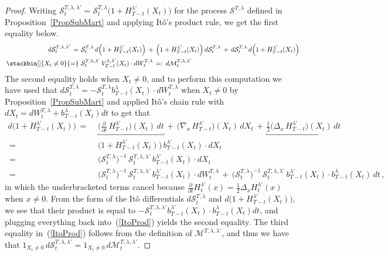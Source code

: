\documentclass[10pt]{article}
\numberwithin{equation}{section}
\theoremstyle{definition}
\begin{document}
\begin{proof}
   Writing $\mathcal{S}_{t}^{T,\lambda,\lambda'}=\mathcal{S}_{t}^{T,\lambda}\big(1+H_{T-t}^{\lambda'}(X_t)\big)$ for the process $\mathcal{S}^{T,\lambda}$ defined  in Proposition~\ref{PropSubMart}  and applying It\^o's product rule, we get the first equality below.
\begin{align} \label{ItoProd}
d\mathcal{S}_{t}^{T, \lambda ,\lambda'}\,=\,&\, \mathcal{S}_{t}^{T,\lambda}\, d\Big(1+H_{T-t}^{\lambda'}(X_t)\Big)\,+\,\Big(1+H_{T-t}^{\lambda'}(X_t)\Big)\,d\mathcal{S}_{t}^{T,\lambda}\,+\,d\mathcal{S}_{t}^{T,\lambda}\, d\Big(1+H_{T-t}^{\lambda'}(X_t)\Big) \nonumber  \\
 \,\stackbin[ ]{X_t\neq 0}{=}\,&\,\mathcal{S}_{t }^{T, \lambda,\lambda'}\,V_{T-t}^{\lambda,\lambda'}(X_t)\cdot dW_{t}^{T,\lambda}  \,=: \, d\mathcal{M}_{t}^{T, \lambda  ,\lambda'}  
\end{align}
The second equality holds when $X_t\neq 0$, and to perform this computation we have used that $d\mathcal{S}_{t}^{T,\lambda} =- \mathcal{S}_{t}^{T,\lambda}  b_{T-t}^{\lambda}( X_t)   \cdot dW_{t}^{T,\lambda}$ when $X_t\neq 0$ by Proposition~\ref{PropSubMart} and  applied It\^o's chain rule with $dX_t=dW_{t}^{T,\lambda}+b_{T-t}^{\lambda}(X_t)dt$ to get that
\begin{align*}
d\Big( 1+H_{T-t}^{\lambda'}(X_t)\Big)  
\,=\,&\,\underbracket{\Big( \frac{ \partial }{\partial t }\, H_{T-t}^{\lambda'} \Big)(X_t)\,dt} 
\,+\,\big(\nabla_x\, H_{T-t}^{\lambda'}\big)(X_t)\, dX_t\,+\,\underbracket{\frac{1}{2}\big(\Delta_x\, H_{T-t}^{\lambda'}\big)(X_t)\, dt} \\
\,=\,&\,\Big(1+H_{T-t}^{\lambda'}(X_t)\Big)\, b_{T-t}^{\lambda'}(X_t) \cdot  dX_{t} \\
\,=\,&\,\big(\mathcal{S}_{t}^{T,\lambda} \big)^{-1}\,\mathcal{S}_{t}^{T,\lambda,\lambda'}\, b_{T-t}^{\lambda'}(X_t) \cdot  dX_{t}
\\
\,=\,&\,\big(\mathcal{S}_{t}^{T,\lambda} \big)^{-1}\,\mathcal{S}_{t}^{T,\lambda,\lambda'}\, b_{T-t}^{\lambda'}(X_t) \cdot  dW_{t}^{T,\lambda}\,+\,\big(\mathcal{S}_{t}^{T,\lambda} \big)^{-1}\,\mathcal{S}_{t}^{T,\lambda,\lambda'}\, b_{T-t}^{\lambda'}(X_t) \cdot b_{T-t}^{\lambda}(X_t)\,dt\,,
\end{align*}
in which the underbracketed terms cancel  because $\frac{ \partial }{\partial t } H_{t}^{\lambda'}(x)= \frac{1}{2}\Delta_x H_{t}^{\lambda'}(x)$ when $x\neq 0$. From the form of the It\^o differentials  $d\mathcal{S}_{t}^{T,\lambda} $ and $ d\big(1+H_{T-t}^{\lambda'}(X_t)\big)$, we see that their product is equal to $-\mathcal{S}_{t}^{T,\lambda,\lambda'} b_{T-t}^{\lambda'}(X_t) \cdot b_{T-t}^{\lambda}(X_t)dt $, and plugging everything back into~(\ref{ItoProd}) yields the second equality. The third equality in~(\ref{ItoProd}) follows from the definition of $\mathcal{M}^{T, \lambda ,\lambda'}$, and thus we have that $ 1_{X_t\neq 0}\,d\mathcal{S}_{t}^{T, \lambda ,\lambda'}=1_{X_t\neq 0}\,d\mathcal{M}_{t}^{T, \lambda ,\lambda'} $.


\end{proof}
\end{document}
